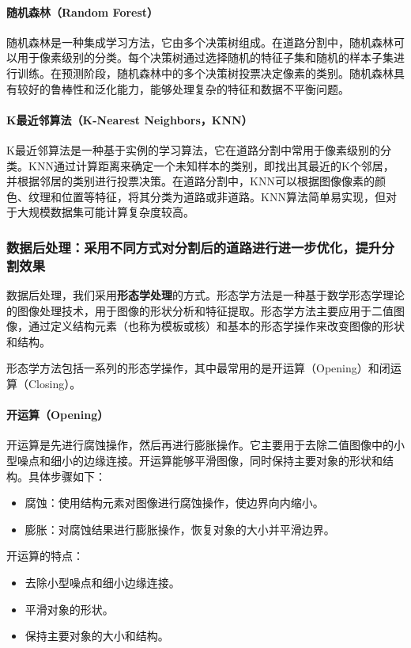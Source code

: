 \documentclass[12pt,hyperref,a4paper,UTF8]{ctexart}
\begin{document}
\paragraph{随机森林（Random Forest）}
随机森林是一种集成学习方法，它由多个决策树组成。在道路分割中，随机森林可以用于像素级别的分类。每个决策树通过选择随机的特征子集和随机的样本子集进行训练。在预测阶段，随机森林中的多个决策树投票决定像素的类别。随机森林具有较好的鲁棒性和泛化能力，能够处理复杂的特征和数据不平衡问题。

\paragraph{K最近邻算法（K-Nearest Neighbors，KNN）}
K最近邻算法是一种基于实例的学习算法，它在道路分割中常用于像素级别的分类。KNN通过计算距离来确定一个未知样本的类别，即找出其最近的K个邻居，并根据邻居的类别进行投票决策。在道路分割中，KNN可以根据图像像素的颜色、纹理和位置等特征，将其分类为道路或非道路。KNN算法简单易实现，但对于大规模数据集可能计算复杂度较高。



\subsubsection{数据后处理：采用不同方式对分割后的道路进行进一步优化，提升分割效果}
数据后处理，我们采用\textbf{形态学处理}的方式。形态学方法是一种基于数学形态学理论的图像处理技术，用于图像的形状分析和特征提取。形态学方法主要应用于二值图像，通过定义结构元素（也称为模板或核）和基本的形态学操作来改变图像的形状和结构。

形态学方法包括一系列的形态学操作，其中最常用的是开运算（Opening）和闭运算（Closing）。

\paragraph{开运算（Opening）}
开运算是先进行腐蚀操作，然后再进行膨胀操作。它主要用于去除二值图像中的小型噪点和细小的边缘连接。开运算能够平滑图像，同时保持主要对象的形状和结构。具体步骤如下：
\begin{itemize}
\item 腐蚀：使用结构元素对图像进行腐蚀操作，使边界向内缩小。
\item 膨胀：对腐蚀结果进行膨胀操作，恢复对象的大小并平滑边界。
\end{itemize}

开运算的特点：
\begin{itemize}
\item 去除小型噪点和细小边缘连接。
\item 平滑对象的形状。
\item 保持主要对象的大小和结构。
\end{itemize}
\end{document}
